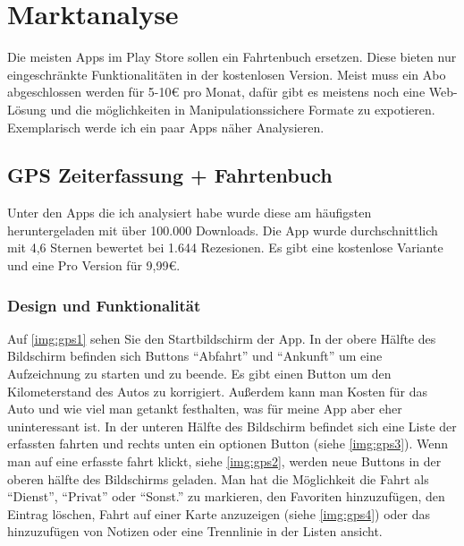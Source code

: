 \section{Marktanalyse}
Die meisten Apps im Play Store sollen ein Fahrtenbuch ersetzen. Diese bieten nur eingeschränkte
Funktionalitäten in der kostenlosen Version. Meist muss ein Abo abgeschlossen werden für 5-10€ pro Monat,
dafür gibt es meistens noch eine Web-Lösung und die möglichkeiten in Manipulationssichere Formate
zu expotieren. Exemplarisch werde ich ein paar Apps näher Analysieren.

\subsection{GPS Zeiterfassung + Fahrtenbuch}
Unter den Apps die ich analysiert habe wurde diese am häufigsten heruntergeladen mit über 100.000 Downloads.
Die App wurde durchschnittlich mit 4,6 Sternen bewertet bei 1.644 Rezesionen. Es gibt eine kostenlose Variante
und eine Pro Version für 9,99€.

\subsubsection{Design und Funktionalität}
Auf \ref{img:gps1} sehen Sie den Startbildschirm der App.
In der obere Hälfte des Bildschirm befinden sich Buttons \enquote{Abfahrt} und \enquote{Ankunft} um eine
Aufzeichnung zu starten und zu beende. Es gibt einen Button um den Kilometerstand des Autos zu korrigiert.
Außerdem kann man Kosten für das Auto und wie viel man getankt festhalten, was für meine App aber eher
uninteressant ist. In der unteren Hälfte des Bildschirm befindet sich eine Liste der erfassten fahrten
und rechts unten ein optionen Button (siehe \ref{img:gps3}). Wenn man auf eine erfasste fahrt klickt, siehe \ref{img:gps2},
werden neue Buttons in der oberen hälfte des Bildschirms geladen. Man hat die Möglichkeit die Fahrt als
\enquote{Dienst}, \enquote{Privat} oder \enquote{Sonst.} zu markieren, den Favoriten hinzuzufügen,
den Eintrag löschen, Fahrt auf einer Karte anzuzeigen (siehe \ref{img:gps4}) oder das hinzuzufügen von Notizen
oder eine Trennlinie in der Listen ansicht.

